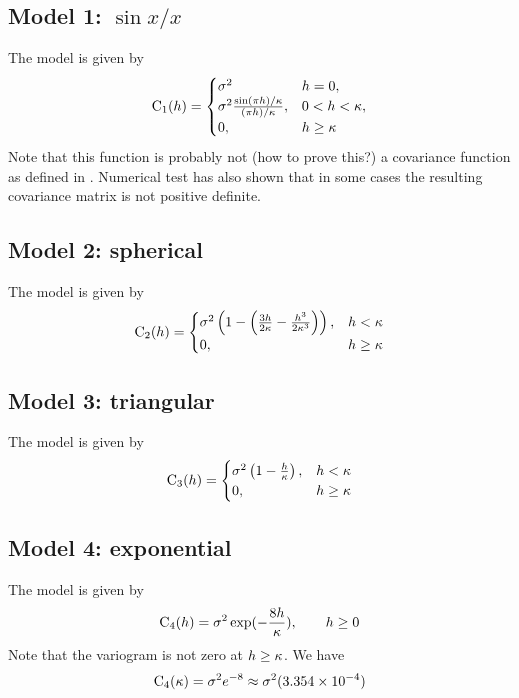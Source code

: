 \documentclass[11pt,a4paper]{amsart}
\begin{document}
\subsection{Model 1: $\sin x/x$}
The model is given by
\begin{align}
  \label{eq:2}
  \operatorname{C}_1(h) =
  \begin{cases}
    \sigma^2 & h = 0,\\
    \sigma^2\frac{\sin (\pi h )/ \kappa}{(\pi h)/\kappa}, & 0 < h < \kappa,\\
    0, & h \geq \kappa
  \end{cases}
\end{align}
Note that this function is probably not (how to prove this?) a covariance function
as defined in \cite{chi12:geo}. Numerical test has also shown that in some cases
the resulting covariance matrix is not positive definite.

\subsection{Model 2:  spherical}
The model is given by \cite{chi12:geo}
\begin{align}
  \label{eq:11}
  \operatorname{C}_2(h) =
  \begin{cases}
    \sigma^2
    \left(
      1 - \left(
        \frac{3h}{2\kappa} - \frac{h^3}{2\kappa^3}
      \right)
    \right), &h<\kappa\\
    0, & h\geq\kappa
  \end{cases}
\end{align}
\subsection{Model 3: triangular}
The model is given by 
\begin{align}
  \label{eq:18}
  \operatorname{C}_3(h) =
  \begin{cases}
    \sigma^2 \left(1 - \frac{h}{\kappa}\right), &h<\kappa\\
    0, & h\geq\kappa
  \end{cases}
\end{align}
\subsection{Model 4: exponential}
The model is given by 
\begin{align}
  \label{eq:19}  
  \operatorname{C}_4(h) =
    \sigma^2 \exp(-\frac{8h}{\kappa}), \qquad h\geq 0
\end{align}
Note that the variogram is not zero at $h \geq \kappa$. We have
\begin{align}
  \label{eq:16}
  \operatorname{C}_4(\kappa) = \sigma^2 e^{-8}\approx \sigma^2 (3.354 \times 10^{-4})
\end{align}
\end{document}
